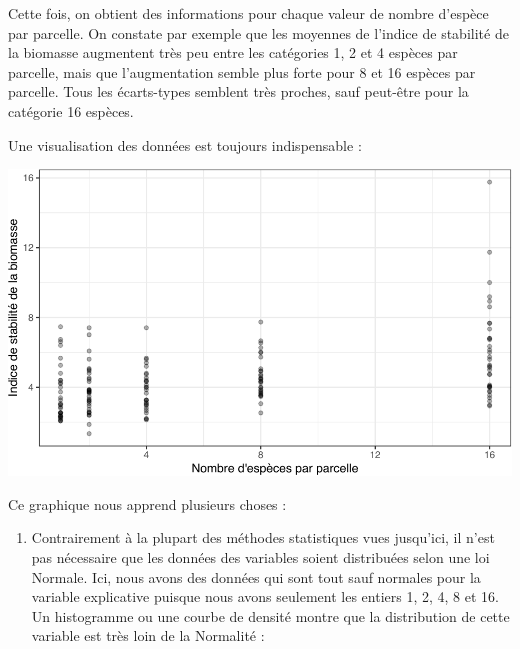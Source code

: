 \documentclass[
  a4paper,
]{article}
\newenvironment{Shaded}{\begin{snugshade}}{\end{snugshade}}
\newcommand{\DataTypeTok}[1]{\textcolor[rgb]{0.00,0.34,0.68}{#1}}
\newcommand{\FloatTok}[1]{\textcolor[rgb]{0.69,0.50,0.00}{#1}}
\newcommand{\KeywordTok}[1]{\textcolor[rgb]{0.12,0.11,0.11}{\textbf{#1}}}
\newcommand{\NormalTok}[1]{\textcolor[rgb]{0.12,0.11,0.11}{#1}}
\newcommand{\OperatorTok}[1]{\textcolor[rgb]{0.12,0.11,0.11}{#1}}
\newcommand{\StringTok}[1]{\textcolor[rgb]{0.75,0.01,0.01}{#1}}
\providecommand{\tightlist}{%
  \setlength{\itemsep}{0pt}\setlength{\parskip}{0pt}}
\begin{document}
Cette fois, on obtient des informations pour chaque valeur de nombre d'espèce par parcelle. On constate par exemple que les moyennes de l'indice de stabilité de la biomasse augmentent très peu entre les catégories 1, 2 et 4 espèces par parcelle, mais que l'augmentation semble plus forte pour 8 et 16 espèces par parcelle. Tous les écarts-types semblent très proches, sauf peut-être pour la catégorie 16 espèces.

Une visualisation des données est toujours indispensable :

\begin{Shaded}
\end{Shaded}

\begin{center}\includegraphics[width=0.9\linewidth]{figure/unnamed-chunk-114-1} \end{center}

Ce graphique nous apprend plusieurs choses :

\begin{enumerate}
\def\labelenumi{\arabic{enumi}.}
\tightlist
\item
  Contrairement à la plupart des méthodes statistiques vues jusqu'ici, il n'est pas nécessaire que les données des variables soient distribuées selon une loi Normale. Ici, nous avons des données qui sont tout sauf normales pour la variable explicative puisque nous avons seulement les entiers 1, 2, 4, 8 et 16. Un histogramme ou une courbe de densité montre que la distribution de cette variable est très loin de la Normalité :
\end{enumerate}
\end{document}
